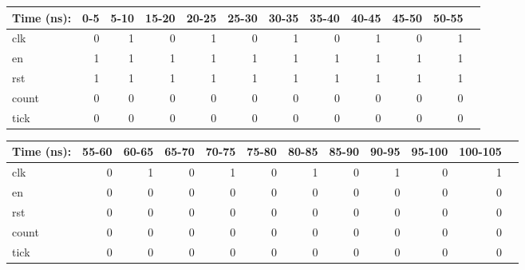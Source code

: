\documentclass[11pt]{article}
\begin{document}
\begin{figure}[ht]\centering
	\begin{tabular}{l|rrrrrrrrrrr}
		Time (ns): & 0-5 & 5-10 & 15-20 & 20-25 & 25-30 &30-35 & 35-40 & 40-45 & 45-50 & 50-55 \\
		\midrule 
		clk& 0 &1  & 0 & 1 & 0 &1 & 0 & 1 & 0 & 1 \\
	    en& 1 &1  & 1 & 1 & 1 &1 & 1 & 1 & 1 & 1 \\
      	rst& 1 &1  & 1 & 1 & 1 &1 & 1 & 1 & 1 & 1 \\
      	count & 0 &0 & 0 & 0 & 0 &0 & 0 & 0 & 0 & 0 \\
      	tick & 0 &0  & 0 & 0 & 0 &0 & 0 & 0 & 0 & 0 \\
		
	\end{tabular}\medskip




\end{figure}
\begin{figure}[ht]\centering
	\begin{tabular}{l|rrrrrrrrrrr}
		Time (ns): & 55-60 & 60-65 & 65-70 & 70-75 & 75-80 &80-85 & 85-90 & 90-95 & 95-100 & 100-105 \\
		\midrule 
		clk& 0 &1  & 0 & 1 & 0 &1 & 0 & 1 & 0 & 1 \\
		en& 0 &0  & 0 & 0 & 0 &0 & 0 & 0 & 0 & 0 \\
		rst& 0 &0  & 0 & 0 & 0 &0 & 0 & 0 & 0 & 0 \\
		count & 0 &0 & 0 & 0 & 0 &0 & 0 & 0 & 0 & 0 \\
		tick & 0 &0  & 0 & 0 & 0 &0 & 0 & 0 & 0 & 0 \\
		
	\end{tabular}\medskip
	
	
	
	
\end{figure}
\end{document}
